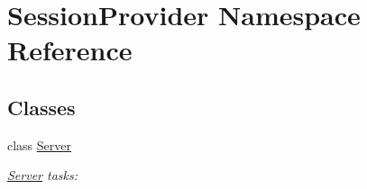 \hypertarget{namespace_session_provider}{}\section{Session\+Provider Namespace Reference}
\label{namespace_session_provider}
\subsection*{Classes}
\begin{DoxyCompactItemize}
\item 
class \mbox{\hyperlink{class_session_provider_1_1_server}{Server}}
\begin{DoxyCompactList}\small\item\em \mbox{\hyperlink{class_session_provider_1_1_server}{Server}} tasks\+: \end{DoxyCompactList}\end{DoxyCompactItemize}
